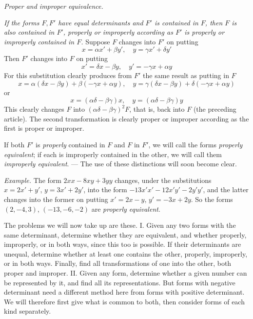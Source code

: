 \begin{center}
\textit{Proper and improper equivalence.}
\end{center}

\textit{If the forms $F,F'$ have equal determinants and $F'$ is contained in $F$, then $F$ is also contained in $F'$, properly or improperly according as $F'$ is properly or improperly contained in $F$.} Suppose $F$ changes into $F'$ on putting
\[
x=\alpha x'+\beta y',\quad y=\gamma x'+\delta y'
\]
Then $F'$ changes into $F$ on putting
\[
x'=\delta x-\beta y,\quad y'=-\gamma x+\alpha y
\]
For this substitution clearly produces from $F'$ the same result as putting in $F$
\[
x=\alpha(\delta x-\beta y)+\beta(-\gamma x+\alpha y),\quad
y=\gamma(\delta x-\beta y)+\delta(-\gamma x+\alpha y)
\]
or
\[
x=(\alpha\delta-\beta\gamma)x,\quad y=(\alpha\delta-\beta\gamma)y
\]
This clearly changes $F$ into $(\alpha\delta-\beta\gamma)^2F$, that is, back into $F$ (the preceding article). The second transformation is clearly proper or improper according as the first is proper or improper.

If both $F'$ is \textit{properly} contained in $F$ and $F$ in $F'$, we will call the forms \textit{properly equivalent}; if each is improperly contained in the other, we will call them \textit{improperly equivalent}. --- The use of these distinctions will soon become clear.

\textit{Example.} The form $2xx-8xy+3yy$ changes, under the substitutions $x=2x'+y'$, $y=3x'+2y'$, into the form $-13x'x'-12x'y'-2y'y'$, and the latter changes into the former on putting $x'=2x-y$, $y'=-3x+2y$. So the forms $(2,-4,3)$, $(-13,-6,-2)$ are \textit{properly equivalent}.

The problems we will now take up are these. I. Given any two forms with the same determinant, determine whether they are equivalent, and whether properly, improperly, or in both ways, since this too is possible. If their determinants are unequal, determine whether at least one contains the other, properly, improperly, or in both ways. Finally, find all transformations of one into the other, both proper and improper. II. Given any form, determine whether a given number can be represented by it, and find all its representations. But forms with negative determinant need a different method here from forms with positive determinant. We will therefore first give what is common to both, then consider forms of each kind separately.
